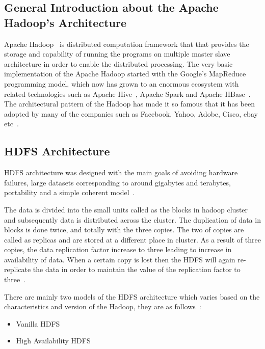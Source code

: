 \subsection{General Introduction about the Apache Hadoop's Architecture}
Apache Hadoop~\cite{hid-sp18-412-ApacheHadoop} is distributed computation framework that that provides 
the storage and capability of running the programs on multiple 
master slave architecture in order to enable the distributed processing. 
The very basic implementation of the Apache Hadoop started with the 
Google’s MapReduce programming model, which now has grown to an 
enormous ecosystem with related technologies such as Apache Hive~\cite{hid-sp18-410-hive}, 
Apache Spark and Apache HBase~\cite{hid-sp18-406-hbase}. The architectural pattern of the Hadoop 
has made it so famous that it has been adopted by many of the companies 
such as Facebook, Yahoo, Adobe, 
Cisco, ebay etc~\cite{hid-sp18-412-hadoop-architecture-overview}.

\subsection{HDFS Architecture}
HDFS architecture was designed with the main goals of avoiding 
hardware failures, large datasets corresponding to around gigabytes 
and terabytes, portability 
and a simple coherent model~\cite{hid-sp18-412-HDFS-Architecture}.

The data is divided into the small units called as the blocks 
in hadoop cluster and subsequently data is distributed 
across the cluster. The duplication of data in blocks 
is done twice, and totally with the three copies. The two of 
copies are called as replicas and are stored at a different 
place in cluster. As a result of three
copies, the data replication factor increase to three 
leading to increase in availability of data. When a certain 
copy is lost then the HDFS will again re-replicate the data in 
order to maintain the value of the 
replication factor to three~\cite{hid-sp18-412-hadoop-architecture-overview}.

There are mainly two models of the HDFS architecture 
which varies based on the characteristics and version 
of the Hadoop, they are 
as follows~\cite{hid-sp18-412-hadoop-architecture-overview}:
\begin{itemize}
\item Vanilla HDFS
\item High Availability HDFS
\end{itemize}

